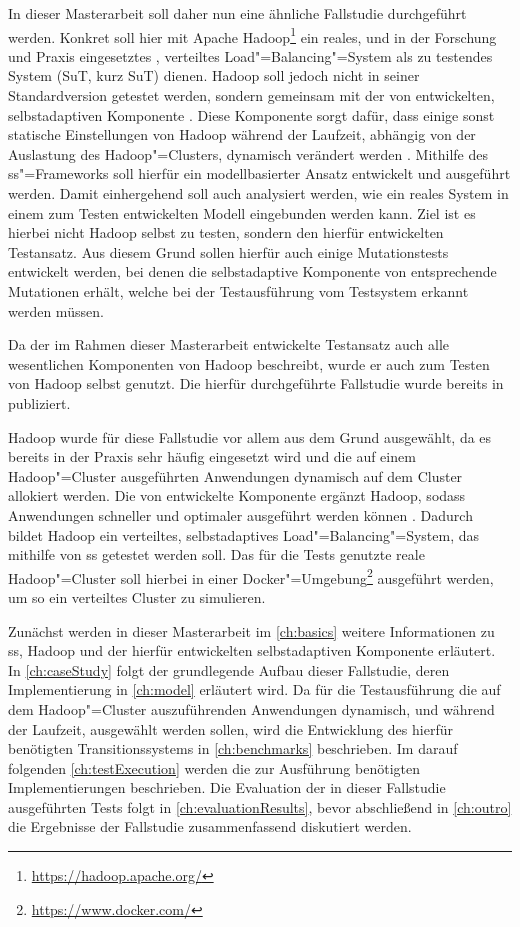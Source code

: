 In dieser Masterarbeit soll daher nun eine ähnliche Fallstudie durchgeführt werden.
Konkret soll hier mit Apache Hadoop\footnote{\url{https://hadoop.apache.org/}} ein reales, und in der Forschung und Praxis eingesetztes \cite{PoweredByHadoop}, verteiltes Load"=Balancing"=System als zu testendes System (\acrlong{SuT}, kurz \acrshort{SuT}) dienen.
Hadoop soll jedoch nicht in seiner Standardversion getestet werden, sondern gemeinsam mit der von \citeauthor{Zhang2016} entwickelten, selbstadaptiven Komponente \cite{Zhang2016}.
Diese Komponente sorgt dafür, dass einige sonst statische Einstellungen von Hadoop während der Laufzeit, abhängig von der Auslastung des Hadoop"=Clusters, dynamisch verändert werden \cite{Zhang2016}.
Mithilfe des \gls{ss}"=Frameworks soll hierfür ein modellbasierter Ansatz entwickelt und ausgeführt werden.
Damit einhergehend soll auch analysiert werden, wie ein reales System in einem zum Testen entwickelten Modell eingebunden werden kann.
Ziel ist es hierbei nicht Hadoop selbst zu testen, sondern den hierfür entwickelten Testansatz.
Aus diesem Grund sollen hierfür auch einige Mutationstests entwickelt werden, bei denen die selbstadaptive Komponente von \citeauthor{Zhang2016} entsprechende Mutationen erhält, welche bei der Testausführung vom Testsystem erkannt werden müssen.

Da der im Rahmen dieser Masterarbeit entwickelte Testansatz auch alle wesentlichen Komponenten von Hadoop beschreibt, wurde er auch zum Testen von Hadoop selbst genutzt.
Die hierfür durchgeführte Fallstudie wurde bereits in \cite{Eberhardinger2018} publiziert.

Hadoop wurde für diese Fallstudie vor allem aus dem Grund ausgewählt, da es bereits in der Praxis sehr häufig eingesetzt wird \cite{PoweredByHadoop} und die auf einem Hadoop"=Cluster ausgeführten Anwendungen dynamisch auf dem Cluster allokiert werden.
Die von \citeauthor{Zhang2016} entwickelte Komponente ergänzt Hadoop, sodass Anwendungen schneller und optimaler ausgeführt werden können \cite{Zhang2016}.
Dadurch bildet Hadoop ein verteiltes, selbstadaptives Load"=Balancing"=System, das mithilfe von \gls{ss} getestet werden soll.
Das für die Tests genutzte reale Hadoop"=Cluster soll hierbei in einer Docker"=Umgebung\footnote{\url{https://www.docker.com/}} ausgeführt werden, um so ein verteiltes Cluster zu simulieren.

Zunächst werden in dieser Masterarbeit im \cref{ch:basics} weitere Informationen zu \gls{ss}, Hadoop und der hierfür entwickelten selbstadaptiven Komponente erläutert.
In \cref{ch:caseStudy} folgt der grundlegende Aufbau dieser Fallstudie, deren Implementierung in \cref{ch:model} erläutert wird.
Da für die Testausführung die auf dem Hadoop"=Cluster auszuführenden Anwendungen dynamisch, und während der Laufzeit, ausgewählt werden sollen, wird die Entwicklung des hierfür benötigten Transitionssystems in \cref{ch:benchmarks} beschrieben.
Im darauf folgenden \cref{ch:testExecution} werden die zur Ausführung benötigten Implementierungen beschrieben.
Die Evaluation der in dieser Fallstudie ausgeführten Tests folgt in \cref{ch:evaluationResults}, bevor abschließend in \cref{ch:outro} die Ergebnisse der Fallstudie zusammenfassend diskutiert werden.
